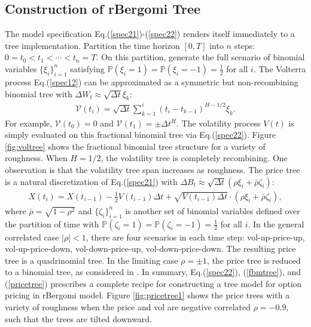 \documentclass[12pt]{article}
\numberwithin{equation}{section}
\begin{document}
\subsection{Construction of rBergomi Tree}
The model specification Eq.(\ref{spec21})-(\ref{spec22}) renders itself immediately to a tree implementation. Partition the time horizon $[0,T]$ into $n$ steps: $0=t_0 < t_1 < \cdots < t_n = T$. On this partition, generate the full scenario of binomial variables $\{\xi_i\}_{i=1}^n$ satisfying $\mathbb{P}(\xi_i=1)=\mathbb{P}(\xi_i=-1)=\frac{1}{2}$ for all $i$. The Volterra process Eq.(\ref{spec12}) can be approximated as a symmetric but non-recombining binomial tree with $\Delta W_t\approx \sqrt{\Delta t}\xi_k$:
\begin{align}
\label{fbmtree}
\mathcal{V}(t_i) = \sqrt{\Delta t} \sum_{k=1}^i (t_i - t_{k-1})^{H-1/2}\xi_k.
\end{align}
For example, $\mathcal{V}(t_0) = 0$ and $\mathcal{V}(t_1)=\pm\Delta t^H$. The volatility process $V(t)$ is simply evaluated on this fractional binomial tree via Eq.(\ref{spec22}). Figure \ref{fig:voltree} shows the fractional binomial tree structure for a variety of roughness. When $H=1/2$, the volatility tree is completely recombining. One observation is that the volatility tree span increases as roughness. The price tree is a natural discretization of Eq.(\ref{spec21}) with $\Delta B_t \approx \sqrt{\Delta t} \left(\rho \xi_i + \bar{\rho}\zeta_i \right)$:
\begin{align}
\label{pricetree}
X(t_i) = X(t_{i-1}) -\frac{1}{2}V(t_{i-1})\Delta t + \sqrt{ V(t_{i-1}) \Delta t} \cdot \left(\rho \xi_i + \bar{\rho}\zeta_i \right),
\end{align}
where $\bar{\rho} = \sqrt{1-\rho^2}$ and $\{\zeta_i\}_{i=1}^n$ is another set of binomial variables defined over the partition of time with $\mathbb{P}(\zeta_i=1)=\mathbb{P}(\zeta_i=-1)=\frac{1}{2}$ for all $i$. In the general correlated case $|\rho|<1$, there are four scenarios in each time step: vol-up-price-up, vol-up-price-down, vol-down-price-up, vol-down-price-down. The resulting price tree is a quadrinomial tree. In the limiting case $\rho = \pm 1$, the price tree is reduced to a binomial tree, as considered in \cite{horvath}. In summary, Eq.(\ref{spec22}), (\ref{fbmtree}), and (\ref{pricetree}) prescribes a complete recipe for constructing a tree model for option pricing in rBergomi model. Figure \ref{fig:pricetree1} shows the price trees with a variety of roughness when the price and vol are negative correlated $\rho=-0.9$, such that the trees are tilted downward. %
\end{document}
